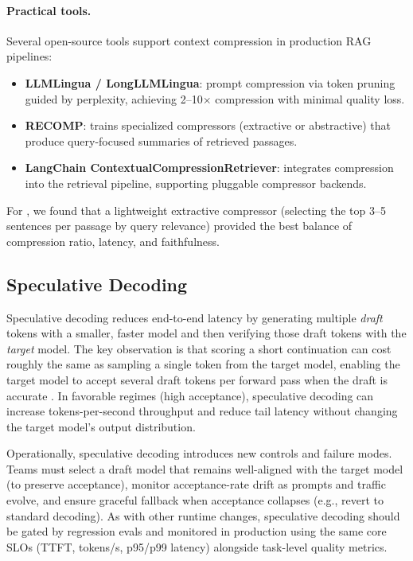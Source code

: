 \paragraph{Practical tools.}
Several open-source tools support context compression in production RAG pipelines:
\begin{itemize}[leftmargin=1.5em, itemsep=2pt]
  \item \textbf{LLMLingua / LongLLMLingua}: prompt compression via token pruning guided by perplexity, achieving 2--10$\times$ compression with minimal quality loss.
  \item \textbf{RECOMP}: trains specialized compressors (extractive or abstractive) that produce query-focused summaries of retrieved passages.
  \item \textbf{LangChain ContextualCompressionRetriever}: integrates compression into the retrieval pipeline, supporting pluggable compressor backends.
\end{itemize}
For \ishtar{}, we found that a lightweight extractive compressor (selecting the top 3--5 sentences per passage by query relevance) provided the best balance of compression ratio, latency, and faithfulness.

\subsection{Speculative Decoding}
\label{sec:perf-speculative}
Speculative decoding reduces end-to-end latency by generating multiple \emph{draft} tokens with a smaller, faster model and then verifying those draft tokens with the \emph{target} model. The key observation is that scoring a short continuation can cost roughly the same as sampling a single token from the target model, enabling the target model to accept several draft tokens per forward pass when the draft is accurate \cite{Chen2023SpeculativeSampling}. In favorable regimes (high acceptance), speculative decoding can increase tokens-per-second throughput and reduce tail latency without changing the target model's output distribution.

Operationally, speculative decoding introduces new controls and failure modes. Teams must select a draft model that remains well-aligned with the target model (to preserve acceptance), monitor acceptance-rate drift as prompts and traffic evolve, and ensure graceful fallback when acceptance collapses (e.g., revert to standard decoding). As with other runtime changes, speculative decoding should be gated by regression evals and monitored in production using the same core SLOs (TTFT, tokens/s, p95/p99 latency) alongside task-level quality metrics.

